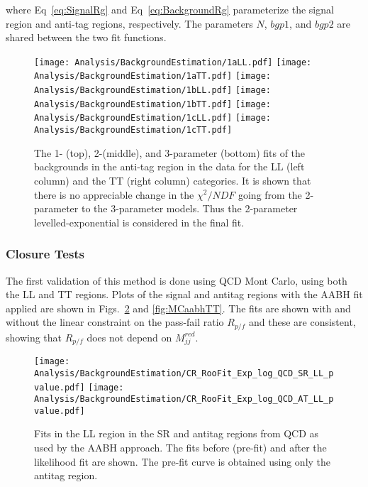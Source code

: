 \noindent
where Eq~\ref{eq:SignalRg} and Eq~\ref{eq:BackgroundRg} parameterize the signal region and anti-tag regions, respectively. The parameters $N$, $bgp1$, and $bgp2$ are shared between the two fit functions. 

\begin{figure}[H]
\begin{center}
  \texttt{[image: Analysis/BackgroundEstimation/1aLL.pdf]}
  \texttt{[image: Analysis/BackgroundEstimation/1aTT.pdf]}
  \texttt{[image: Analysis/BackgroundEstimation/1bLL.pdf]}
  \texttt{[image: Analysis/BackgroundEstimation/1bTT.pdf]}
  \texttt{[image: Analysis/BackgroundEstimation/1cLL.pdf]}
  \texttt{[image: Analysis/BackgroundEstimation/1cTT.pdf]}
\end{center}
  \caption{The 1- (top), 2-(middle), and 3-parameter (bottom) fits of the backgrounds in the anti-tag region in the data for the LL (left column) and the TT (right column) categories. It is shown that there is no appreciable change in the $\chi^{2}/NDF$ going from the 2-parameter to the 3-parameter models. Thus the 2-parameter levelled-exponential is considered in the final fit.} \label{fig:app_FTest}
\end{figure}

\subsubsection{Closure Tests}

The first validation of this method is done using QCD Mont Carlo, using both the LL and TT regions. Plots of the signal and antitag regions with the AABH fit applied are shown in Figs.~\ref{fig:MCaabhLL} and \ref{fig:MCaabhTT}. The fits are shown with and without the linear constraint on the pass-fail ratio $R_{p/f}$ and these are consistent, showing that $R_{p/f}$ does not depend on $M_{jj}^{red}$.

\begin{figure}[H]
\centering
\texttt{[image: Analysis/BackgroundEstimation/CR\_RooFit\_Exp\_log\_QCD\_SR\_LL\_pvalue.pdf]}
\texttt{[image: Analysis/BackgroundEstimation/CR\_RooFit\_Exp\_log\_QCD\_AT\_LL\_pvalue.pdf]}
  \caption{Fits in the LL region in the SR and antitag regions from QCD as used by the AABH approach. The fits before (pre-fit) and after the likelihood fit are shown. The pre-fit curve is obtained using only the antitag region.}
\label{fig:MCaabhLL}
\end{figure}

